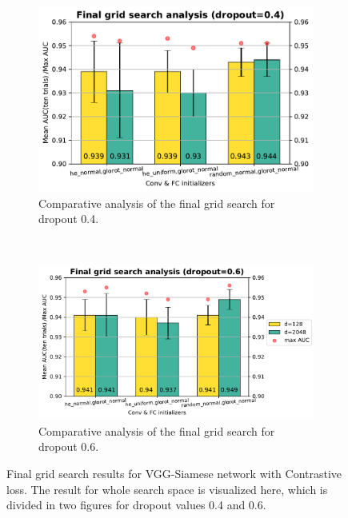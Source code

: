 \begin{figure}
  \centering
  \begin{subfigure}[b]{5.885cm}
    \includegraphics[width=\textwidth]{images/contrastive/contrastive_loss_final_04_bar}
    \caption{Comparative analysis of the final grid search for dropout 0.4.}
    \label{fig:contrastive_loss_final_04_bar}
  \end{subfigure}
  ~ %
  \begin{subfigure}[b]{7cm}
    \includegraphics[width=\textwidth]{images/contrastive/contrastive_loss_final_06_bar}
    \caption{Comparative analysis of the final grid search for dropout 0.6.}
    \label{fig:contrastive_loss_final_06_bar}
  \end{subfigure}    
  \caption[Final grid search results for VGG-Siamese network with Contrastive loss.]{Final grid search results for VGG-Siamese network with Contrastive loss. The result for whole search space is visualized here, which is divided
  in two figures for dropout values 0.4 and 0.6.}
  \label{fig:contrastive_loss_final_bar}
\end{figure}

